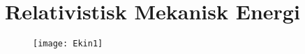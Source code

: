 \chapter{Relativistisk Mekanisk Energi}
\label{sec:RelativistiskMekaniskEnergi}


\begin{figure}[h]
	\centering
%	
	\texttt{[image: Ekin1]}
\end{figure}

\lipsum